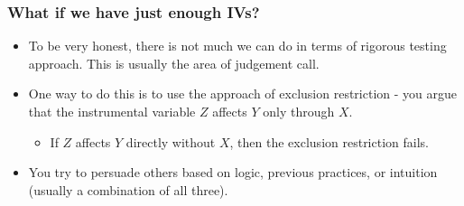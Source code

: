 \documentclass[aspectratio=169]{beamer}
\begin{document}
\begin{frame}
\frametitle{What if we have just enough IVs?}
\begin{itemize}
\item To be very honest, there is not much we can do in terms of rigorous testing approach. This is usually the area of judgement call. 
\item One way to do this is to use the approach of exclusion restriction - you argue that the instrumental variable $Z$ affects $Y$ only through $X$. 
\begin{itemize}
\item If $Z$ affects $Y$ directly without $X$, then the exclusion restriction fails. 
\end{itemize}
\item You try to persuade others based on logic, previous practices, or intuition (usually a combination of all three). 
\end{itemize}
\end{frame}
\end{document}
